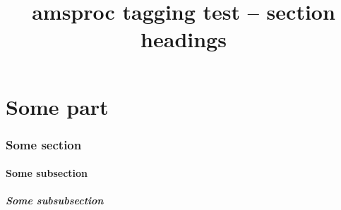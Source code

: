 \documentclass{amsart}
\title{amsproc tagging test -- section headings}
\begin{document}
\part{Some part}
\section{Some section}
\subsection{Some subsection}
\subsubsection{Some subsubsection}
\end{document}
